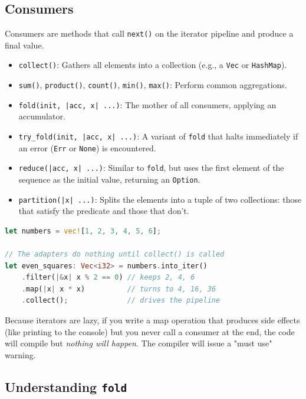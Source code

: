 \subsection{Consumers}

Consumers are methods that call \texttt{next()} on the iterator pipeline and produce a final value.
\begin{itemize}
    \item \texttt{collect()}: Gathers all elements into a collection (e.g., a \texttt{Vec} or \texttt{HashMap}).
    \item \texttt{sum()}, \texttt{product()}, \texttt{count()}, \texttt{min()}, \texttt{max()}: Perform common aggregations.
    \item \texttt{fold(init, |acc, x| ...)}: The mother of all consumers, applying an accumulator.
    \item \texttt{try\_fold(init, |acc, x| ...)}: A variant of \texttt{fold} that halts immediately if an error (\texttt{Err} or \texttt{None}) is encountered.
    \item \texttt{reduce(|acc, x| ...)}: Similar to \texttt{fold}, but uses the first element of the sequence as the initial value, returning an \texttt{Option}.
    \item \texttt{partition(|x| ...)}: Splits the elements into a tuple of two collections: those that satisfy the predicate and those that don't.
\end{itemize}

\begin{lstlisting}[language=Rust]
let numbers = vec![1, 2, 3, 4, 5, 6];

// The adapters do nothing until collect() is called
let even_squares: Vec<i32> = numbers.into_iter()
    .filter(|&x| x % 2 == 0) // keeps 2, 4, 6
    .map(|x| x * x)          // turns to 4, 16, 36
    .collect();              // drives the pipeline
\end{lstlisting}

\begin{warningbox}
Because iterators are lazy, if you write a map operation that produces side effects (like printing to the console) but you never call a consumer at the end, the code will compile but \textit{nothing will happen}. The compiler will issue a "must use" warning.
\end{warningbox}

\subsection{Understanding \texttt{fold}}

